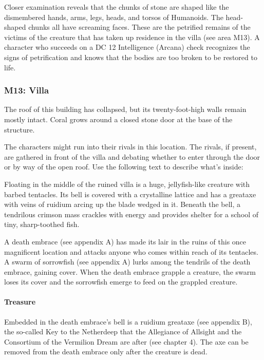 \documentclass[10pt,a4paper,twoside,twocolumn,openany,nodeprecatedcode]{dndbook}
\begin{document}
Closer examination reveals that the chunks of stone are shaped like the dismembered hands, arms, legs, heads, and torsos of Humanoids. The head-shaped chunks all have screaming faces. These are the petrified remains of the victims of the creature that has taken up residence in the villa (see area M13). A character who succeeds on a DC 12 Intelligence (Arcana) check recognizes the signs of petrification and knows that the bodies are too broken to be restored to life.

\subsubsection{M13: Villa}
\begin{DndReadAloud}{}
The roof of this building has collapsed, but its twenty-foot-high walls remain mostly intact. Coral grows around a closed stone door at the base of the structure.

\end{DndReadAloud}

The characters might run into their rivals in this location. The rivals, if present, are gathered in front of the villa and debating whether to enter through the door or by way of the open roof. Use the following text to describe what's inside:

\begin{DndReadAloud}{}
Floating in the middle of the ruined villa is a huge, jellyfish-like creature with barbed tentacles. Its bell is covered with a crystalline lattice and has a greataxe with veins of ruidium arcing up the blade wedged in it. Beneath the bell, a tendrilous crimson mass crackles with energy and provides shelter for a school of tiny, sharp-toothed fish.

\end{DndReadAloud}

A death embrace (see appendix A) has made its lair in the ruins of this once magnificent location and attacks anyone who comes within reach of its tentacles. A swarm of sorrowfish (see appendix A) lurks among the tendrils of the death embrace, gaining cover. When the death embrace grapple a creature, the swarm loses its cover and the sorrowfish emerge to feed on the grappled creature.

\paragraph{Treasure}
Embedded in the death embrace's bell is a ruidium greataxe (see appendix B), the so-called Key to the Netherdeep that the Allegiance of Allsight and the Consortium of the Vermilion Dream are after (see chapter 4). The axe can be removed from the death embrace only after the creature is dead.
\end{document}
